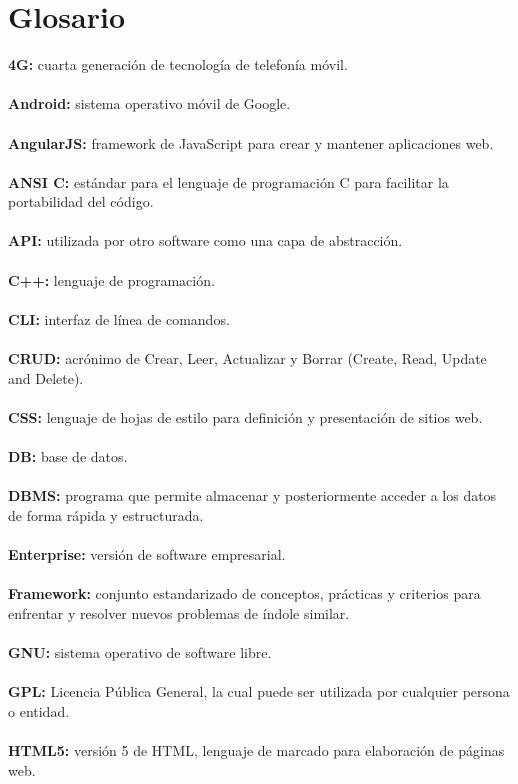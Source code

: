 \documentclass[a4paper,openright,11pt]{article}
\begin{document}
\section{Glosario}
\noindent 
\textbf{4G:} cuarta generación de tecnología de telefonía móvil.\\ \\
\textbf{Android:} sistema operativo móvil de Google. \\\\
\textbf{AngularJS:} framework de JavaScript para crear y mantener aplicaciones web.\\ \\
\textbf{ANSI C:} estándar para el lenguaje de programación C para facilitar la portabilidad del código.\\ \\
\textbf{API:} utilizada por otro software como una capa de abstracción. \\\\
\textbf{C++:} lenguaje de programación.\\\\
\textbf{CLI:} interfaz de línea de comandos.\\ \\
\textbf{CRUD:} acrónimo de Crear, Leer, Actualizar y Borrar (Create, Read, Update and Delete).\\ \\
\textbf{CSS:} lenguaje de hojas de estilo para definición y presentación de sitios web.\\ \\
\textbf{DB:} base de datos. \\\\
\textbf{DBMS:} programa que permite almacenar y posteriormente acceder a los datos de forma rápida y estructurada.\\\\
\textbf{Enterprise:} versión de software empresarial.\\ \\
\textbf{Framework:} conjunto estandarizado de conceptos, prácticas y criterios para enfrentar y resolver nuevos problemas de índole similar. \\\\
\textbf{GNU:} sistema operativo de software libre.\\ \\
\textbf{GPL:} Licencia Pública General, la cual puede ser utilizada por cualquier persona o entidad.\\ \\
\textbf{HTML5:} versión 5 de HTML, lenguaje de marcado para elaboración de páginas web.\\ \\
\end{document}
